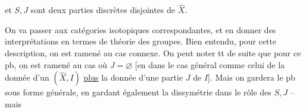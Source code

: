 et $S,J$ sont deux parties discrètes disjointes de $\hat X$.

On va  passer aux catégories isotopiques correspondantes, et en donner des interprétations en termes de théorie des groupes. Bien entendu, pour cette description, on est ramené au cas connexe. On peut  noter tt de suite que pour ce pb, on est ramené au cas où $J=\varnothing$ [en  dans le cas général comme celui de la donnée d'un $(\hat X,I)$ \uline{plus} la donnée d'une partie $J$ de $I$]. Mais on gardera le pb sous  forme générale, en gardant également la dissymétrie dans le rôle des $S,J$ -- mais

